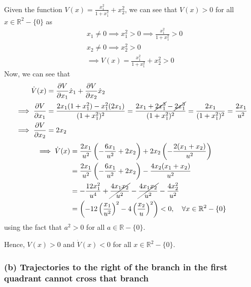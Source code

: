 Given the function \( \displaystyle V(x) = \frac{x_1^2}{1 + x_1^2} + x_2^2 \), we can see that \( V(x) > 0 \) for all \( x \in \mathbb{R}^2 - \{ 0 \} \) as
\begin{align*}
     &
    x_1 \neq 0
    \implies
    x_1^2 > 0
    \implies
    \frac{x_1^2}{1 + x_1^2} > 0
    \\ &
    x_2 \neq 0
    \implies
    x_2^2 > 0
    \\ &
    \implies
    V(x) =
    \frac{x_1^2}{1 + x_1^2} + x_2^2
    > 0
\end{align*}
Now, we can see that
\begin{align*}
    \dot{V}(x)
     & =
    \frac{\partial V}{\partial x_1} \dot{x}_1 + \frac{\partial V}{\partial x_2} \dot{x}_2
    \\
    \implies
    \frac{\partial V}{\partial x_1}
     & =
    \frac{2 x_1 (1 + x_1^2) - x_1^2 (2 x_1)}{(1 + x_1^2)^2}
    =
    \frac{2 x_1 + \cancel{2 x_1^3} - \cancel{2 x_1^3}}{(1 + x_1^2)^2}
    =
    \frac{2 x_1}{(1 + x_1^2)^2}
    =
    \frac{2 x_1}{u^2}
    \\
    \implies
    \frac{\partial V}{\partial x_2}
     & =
    2 x_2
\end{align*}
\begin{align*}
    \implies
    \dot{V}(x)
     & =
    \frac{2 x_1}{u^2} \left( -\frac{6 x_1}{u^2} + 2 x_2 \right) + 2 x_2 \left( -\frac{2 (x_1 + x_2)}{u^2} \right)
    \\ & =
    \frac{2 x_1}{u^2} \left( -\frac{6 x_1}{u^2} + 2 x_2 \right) - \frac{4 x_2 (x_1 + x_2)}{u^2}
    \\ & =
    -\frac{12 x_1^2}{u^4} + \cancel{\frac{4 x_1 x_2}{u^2}} - \cancel{\frac{4 x_1 x_2}{u^2}} - \frac{4 x_2^2}{u^2}
    \\ & =
    \left( -12 \left( \frac{x_1}{u^2} \right)^2 - 4 \left( \frac{x_2}{u} \right)^2 \right)
    <
    0,
    \quad
    \forall x \in \mathbb{R}^2 - \{ 0 \}
\end{align*}
using the fact that \( a^2 > 0 \) for all \( a \in \mathbb{R} - \{ 0 \} \).

Hence, \( V(x) > 0 \) and \( \dot{V}(x) < 0 \) for all \( x \in \mathbb{R}^2 - \{ 0 \} \).

\subsubsection*{(b) Trajectories to the right of the branch in the first quadrant cannot cross that branch}

